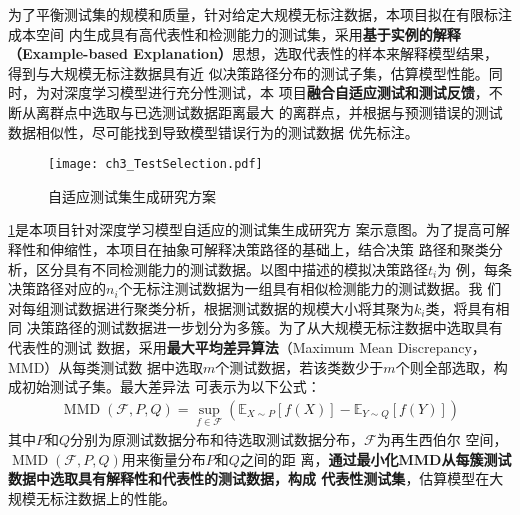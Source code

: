 为了平衡测试集的规模和质量，针对给定大规模无标注数据，本项目拟在有限标注成本空间
内生成具有高代表性和检测能力的测试集，采用\textbf{基于实例的解释（Example-based
    Explanation）}思想，选取代表性的样本来解释模型结果，得到与大规模无标注数据具有近
似决策路径分布的测试子集，估算模型性能。同时，为对深度学习模型进行充分性测试，本
项目\textbf{融合自适应测试和测试反馈}，不断从离群点中选取与已选测试数据距离最大
的离群点，并根据与预测错误的测试数据相似性，尽可能找到导致模型错误行为的测试数据
优先标注。



\begin{figure}[htp]
    \begin{small}
        \begin{center}
            \texttt{[image: ch3\_TestSelection.pdf]}
        \end{center}
        \caption{自适应测试集生成研究方案}
        \label{fig:ch3:interpretability}
    \end{small}
\end{figure}

\cref{fig:ch3:interpretability}是本项目针对深度学习模型自适应的测试集生成研究方
案示意图。为了提高可解释性和伸缩性，本项目在抽象可解释决策路径的基础上，结合决策
路径和聚类分析，区分具有不同检测能力的测试数据。以图中描述的模拟决策路径$t_i$为
例，每条决策路径对应的$n_i$个无标注测试数据为一组具有相似检测能力的测试数据。我
们对每组测试数据进行聚类分析，根据测试数据的规模大小将其聚为$k_i$类，将具有相同
决策路径的测试数据进一步划分为多簇。为了从大规模无标注数据中选取具有代表性的测试
数据，采用\textbf{最大平均差异算法}（Maximum Mean Discrepancy，MMD）从每类测试数
据中选取$m$个测试数据，若该类数少于$m$个则全部选取，构成初始测试子集。最大差异法
可表示为以下公式：
\begin{equation}
    \begin{aligned}
        \operatorname{MMD}(\mathcal{F}, P, Q)=\sup _{f \in \mathcal{F}}\left(\mathbb{E}_{X \sim P}[f(X)]-\mathbb{E}_{Y \sim Q}[f(Y)]\right)
    \end{aligned}
\end{equation}
其中$P$和$Q$分别为原测试数据分布和待选取测试数据分布，$\mathcal{F}$为再生西伯尔
空间，$\operatorname{MMD}(\mathcal{F}, P, Q)$用来衡量分布$P$和$Q$之间的距
离，\textbf{通过最小化MMD从每簇测试数据中选取具有解释性和代表性的测试数据，构成
    代表性测试集}，估算模型在大规模无标注数据上的性能。

